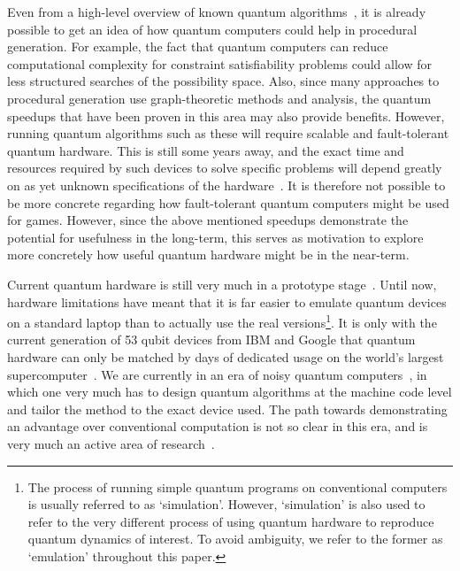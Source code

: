 \documentclass[conference]{IEEEtran}
\begin{document}
Even from a high-level overview of known quantum algorithms~\cite{algorithm-zoo}, it is already possible to get an idea of how quantum computers could help in procedural generation. For example, the fact that quantum computers can reduce computational complexity for constraint satisfiability problems could allow for less structured searches of the possibility space. Also, since many approaches to procedural generation use graph-theoretic methods and analysis, the quantum speedups that have been proven in this area may also provide benefits. However, running quantum algorithms such as these will require scalable and fault-tolerant quantum hardware. This is still some years away, and the exact time and resources required by such devices to solve specific problems will depend greatly on as yet unknown specifications of the hardware~\cite{campbell:19}. It is therefore not possible to be more concrete regarding how fault-tolerant quantum computers might be used for games. However, since the above mentioned speedups demonstrate the potential for usefulness in the long-term, this serves as motivation to explore more concretely how useful quantum hardware might be in the near-term.

Current quantum hardware is still very much in a prototype stage~\cite{quantum-volume}. Until now, hardware limitations have meant that it is far easier to emulate quantum devices on a standard laptop than to actually use the real versions\footnote{The process of running simple quantum programs on conventional computers is usually referred to as `simulation'. However, `simulation' is also used to refer to the very different process of using quantum hardware to reproduce quantum dynamics of interest. To avoid ambiguity, we refer to the former as `emulation' throughout this paper.}. It is only with the current generation of 53 qubit devices from IBM and Google that quantum hardware can only be matched by days of dedicated usage on the world’s largest supercomputer~\cite{google-supremacy,ibm-summit}. We are currently in an era of noisy quantum computers~\cite{nisq}, in which one very much has to design quantum algorithms at the machine code level and tailor the method to the exact device used. The path towards demonstrating an advantage over conventional computation is not so clear in this era, and is very much an active area of research~\cite{ibm-nisq}.
\end{document}
